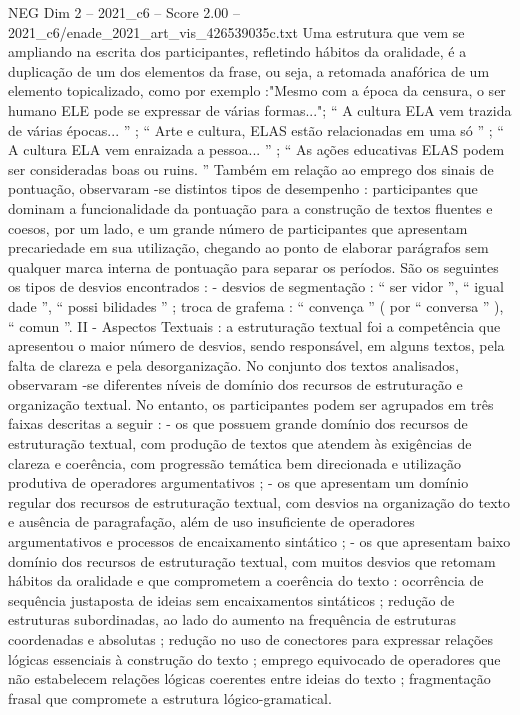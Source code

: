 \begin{textsample}{NEG Dim 2 – 2021\_c6 – Score 2.00 – 2021\_c6/enade\_2021\_art\_vis\_426539035c.txt}
Uma estrutura que vem se ampliando na escrita dos participantes, refletindo hábitos da oralidade, é a duplicação de um dos elementos da frase, ou seja, a retomada anafórica de um elemento topicalizado, como por exemplo :"Mesmo com a época da censura, o ser humano ELE pode se expressar de várias formas..."; “ A cultura ELA vem trazida de várias épocas... ” ; “ Arte e cultura, ELAS estão relacionadas em uma só ” ; “ A cultura ELA vem enraizada a pessoa... ” ; “ As ações educativas ELAS podem ser consideradas boas ou ruins. ” Também em relação ao emprego dos sinais de pontuação, observaram -se distintos tipos de desempenho : participantes que dominam a funcionalidade da pontuação para a construção de textos fluentes e coesos, por um lado, e um grande número de participantes que apresentam precariedade em sua utilização, chegando ao ponto de elaborar parágrafos sem qualquer marca interna de pontuação para separar os períodos.
São os seguintes os tipos de desvios encontrados : - desvios de segmentação : “ ser vidor ”, “ igual dade ”, “ possi bilidades ” ; troca de grafema : “ convença ” ( por “ conversa ” ), “ comun ”.
II - Aspectos Textuais : a estruturação textual foi a competência que apresentou o maior número de desvios, sendo responsável, em alguns textos, pela falta de clareza e pela desorganização.
No conjunto dos textos analisados, observaram -se diferentes níveis de domínio dos recursos de estruturação e organização textual.
No entanto, os participantes podem ser agrupados em três faixas descritas a seguir : - os que possuem grande domínio dos recursos de estruturação textual, com produção de textos que atendem às exigências de clareza e coerência, com progressão temática bem direcionada e utilização produtiva de operadores argumentativos ; - os que apresentam um domínio regular dos recursos de estruturação textual, com desvios na organização do texto e ausência de paragrafação, além de uso insuficiente de operadores argumentativos e processos de encaixamento sintático ; - os que apresentam baixo domínio dos recursos de estruturação textual, com muitos desvios que retomam hábitos da oralidade e que comprometem a coerência do texto : ocorrência de sequência justaposta de ideias sem encaixamentos sintáticos ; redução de estruturas subordinadas, ao lado do aumento na frequência de estruturas coordenadas e absolutas ; redução no uso de conectores para expressar relações lógicas essenciais à construção do texto ; emprego equivocado de operadores que não estabelecem relações lógicas coerentes entre ideias do texto ; fragmentação frasal que compromete a estrutura lógico-gramatical.

\end{textsample}
